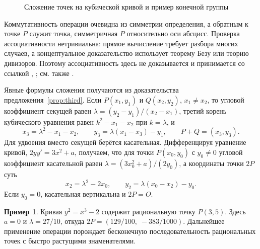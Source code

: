 \documentclass[a4paper,14pt]{extreport}
\theoremstyle{definition}
\newtheorem{exmp}[thm]{Пример}
\begin{document}
\begin{figure}[htbp]
\caption{Сложение точек на кубической кривой и пример конечной группы}
\label{fig:cubic}
\end{figure}

Коммутативность операции очевидна из симметрии определения, а обратным к точке
$P$ служит точка, симметричная $P$ относительно оси абсцисс. Проверка
ассоциативности нетривиальна: прямое вычисление требует разбора многих случаев,
а концептуальное доказательство использует теорему Безу или теорию дивизоров.
Поэтому ассоциативность здесь не доказывается и принимается со ссылкой
\cite[гл.~I, \S~4]{silverman}, \cite[гл.~7]{cassels}; см. также \cite{prasolov}.

Явные формулы сложения получаются из доказательства
предложения~\ref{prop:third}. Если $P(x_1,y_1)$ и $Q(x_2,y_2)$, $x_1\neq x_2$, то
угловой коэффициент секущей равен $\lambda=(y_2-y_1)/(x_2-x_1)$, третий корень
кубического уравнения равен $k^2-x_1-x_2$ при $k=\lambda$, и
\begin{equation}\label{eq:add}
  x_3=\lambda^2-x_1-x_2,\qquad y_3=\lambda(x_1-x_3)-y_1,\qquad P+Q=(x_3,y_3).
\end{equation}
Для удвоения вместо секущей берётся касательная. Дифференцируя уравнение кривой,
$2yy'=3x^2+a$, получаем, что для точки $P(x_0,y_0)$ с $y_0\neq0$ угловой
коэффициент касательной равен $\lambda=(3x_0^2+a)/(2y_0)$, а координаты точки
$2P$ суть
\begin{equation}\label{eq:double}
  x_2=\lambda^2-2x_0,\qquad y_2=\lambda(x_0-x_2)-y_0 .
\end{equation}
Если $y_0=0$, касательная вертикальна и $2P=O$.

\begin{exmp}
Кривая $y^2=x^3-2$ содержит рациональную точку $P(3,5)$. Здесь $a=0$ и
$\lambda=27/10$, откуда $2P=(129/100,\;-383/1000)$. Дальнейшее применение
операции порождает бесконечную последовательность рациональных точек с быстро
растущими знаменателями.
\end{exmp}
\end{document}
